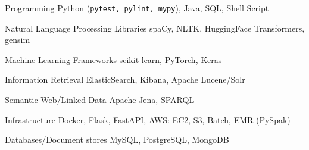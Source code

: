 

\begin{cvskills}

  \cvskill
    {Programming} %
    {Python (\texttt{pytest, pylint, mypy}), Java, SQL, Shell Script} %

  \cvskill
    {Natural Language Processing Libraries} %
    {spaCy, NLTK, HuggingFace Transformers, gensim} %

  \cvskill
    {Machine Learning Frameworks} %
    {scikit-learn, PyTorch, Keras} %

  \cvskill
    {Information Retrieval} %
    {ElasticSearch, Kibana, Apache Lucene/Solr} %

  \cvskill
    {Semantic Web/Linked Data} %
    {Apache Jena, SPARQL} %

  \cvskill
    {Infrastructure} %
    {Docker, Flask, FastAPI, AWS: EC2, S3, Batch, EMR (PySpak)} %

  \cvskill
    {Databases/Document stores} %
    {MySQL, PostgreSQL, MongoDB} %

\end{cvskills}
